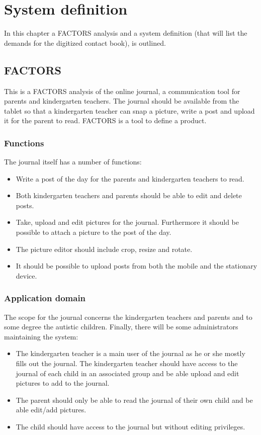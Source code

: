 \chapter{System definition}
In this chapter a FACTORS analysis and a system definition (that will list the demands for the digitized contact book), is outlined.

\section{FACTORS}
This is a FACTORS analysis of the online journal, a communication tool for parents and kindergarten teachers. The journal should be available from the tablet so that a kindergarten teacher can snap a picture, write a post and upload it for the parent to read. FACTORS is a tool to define a product.

\subsection{Functions}
The journal itself has a number of functions:
\begin{itemize}
	\item{Write a post of the day for the parents and kindergarten teachers to read.}
	\item{Both kindergarten teachers and parents should be able to edit and delete posts.}
	\item{Take, upload and edit pictures for the journal. Furthermore it should be possible to attach a picture to the post of the day.}
	\item{The picture editor should include crop, resize and rotate.}
	\item{It should be possible to upload posts from both the mobile and the stationary device.}
\end{itemize}

\subsection{Application domain}
The scope for the journal concerns the kindergarten teachers and parents and to some degree the autistic children. Finally, there will be some administrators maintaining the system:
\begin{itemize}
	\item{The kindergarten teacher is a main user of the journal as he or she mostly fills out the journal. The kindergarten teacher should have access to the journal of each child in an associated group and be able upload and edit pictures to add to the journal.}
	\item{The parent should only be able to read the journal of their own child and be able edit/add pictures.}
	\item{The child should have access to the journal but without editing privileges.}
\end{itemize}

